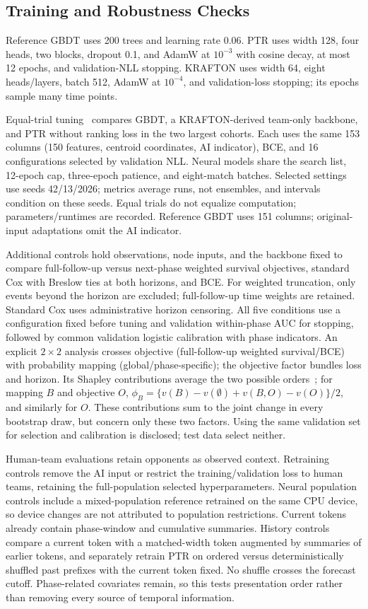 \documentclass[sigconf,anonymous,nonacm]{acmart}
\begin{document}
\subsection{Training and Robustness Checks}
Reference GBDT uses 200 trees and learning rate 0.06. PTR uses width 128, four heads, two blocks, dropout 0.1, and AdamW at $10^{-3}$ with cosine decay, at most 12 epochs, and validation-NLL stopping. KRAFTON uses width 64, eight heads/layers, batch 512, AdamW at $10^{-4}$, and validation-loss stopping; its epochs sample many time points.

Equal-trial tuning~\cite{Bergstra12,Cawley10} compares GBDT, a KRAFTON-derived team-only backbone, and PTR without ranking loss in the two largest cohorts. Each uses the same 153 columns (150 features, centroid coordinates, AI indicator), BCE, and 16 configurations selected by validation NLL. Neural models share the search list, 12-epoch cap, three-epoch patience, and eight-match batches. Selected settings use seeds 42/13/2026; metrics average runs, not ensembles, and intervals condition on these seeds. Equal trials do not equalize computation; parameters/runtimes are recorded. Reference GBDT uses 151 columns; original-input adaptations omit the AI indicator.

Additional controls hold observations, node inputs, and the backbone fixed to compare full-follow-up versus next-phase weighted survival objectives, standard Cox with Breslow ties at both horizons, and BCE. For weighted truncation, only events beyond the horizon are excluded; full-follow-up time weights are retained. Standard Cox uses administrative horizon censoring. All five conditions use a configuration fixed before tuning and validation within-phase AUC for stopping, followed by common validation logistic calibration with phase indicators. An explicit $2\times2$ analysis crosses objective (full-follow-up weighted survival/BCE) with probability mapping (global/phase-specific); the objective factor bundles loss and horizon. Its Shapley contributions average the two possible orders~\cite{Shorrocks13}; for mapping $B$ and objective $O$, $\phi_B=\{v(B)-v(\emptyset)+v(B,O)-v(O)\}/2$, and similarly for $O$. These contributions sum to the joint change in every bootstrap draw, but concern only these two factors. Using the same validation set for selection and calibration is disclosed; test data select neither.

Human-team evaluations retain opponents as observed context. Retraining controls remove the AI input or restrict the training/validation loss to human teams, retaining the full-population selected hyperparameters. Neural population controls include a mixed-population reference retrained on the same CPU device, so device changes are not attributed to population restrictions. Current tokens already contain phase-window and cumulative summaries. History controls compare a current token with a matched-width token augmented by summaries of earlier tokens, and separately retrain PTR on ordered versus deterministically shuffled past prefixes with the current token fixed. No shuffle crosses the forecast cutoff. Phase-related covariates remain, so this tests presentation order rather than removing every source of temporal information.
\end{document}
